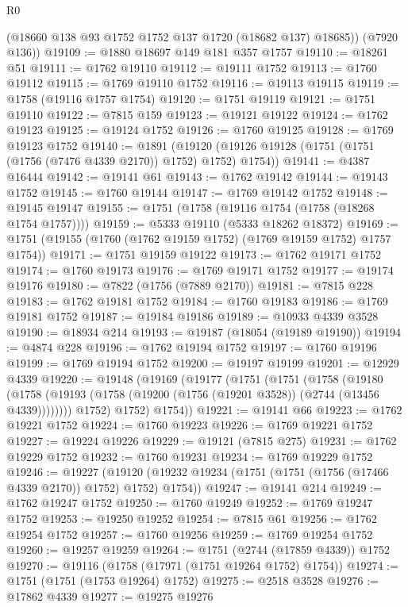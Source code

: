 \begin{lexlean}{R0}
\begin{coremodule}
        (@18660 @138 @93 @1752 @1752 @137 @1720 (@18682 @137) @18685))
      (@7920 @136))
@19109 := @1880 @18697 @149 @181 @357 @1757
@19110 := @18261 @51
@19111 := @1762 @19110
@19112 := @19111 @1752
@19113 := @1760 @19112
@19115 := @1769 @19110 @1752
@19116 := @19113 @19115
@19119 := @1758 (@19116 @1757 @1754)
@19120 := @1751 @19119
@19121 := @1751 @19110
@19122 := @7815 @159
@19123 := @19121 @19122
@19124 := @1762 @19123
@19125 := @19124 @1752
@19126 := @1760 @19125
@19128 := @1769 @19123 @1752
@19140 := @1891
    (@19120 (@19126 @19128 (@1751 (@1751 (@1756 (@7476 @4339 @2170)) @1752) @1752) @1754))
@19141 := @4387 @16444
@19142 := @19141 @61
@19143 := @1762 @19142
@19144 := @19143 @1752
@19145 := @1760 @19144
@19147 := @1769 @19142 @1752
@19148 := @19145 @19147
@19155 := @1751 (@1758 (@19116 @1754 (@1758 (@18268 @1754 @1757))))
@19159 := @5333 @19110 (@5333 @18262 @18372)
@19169 := @1751 (@19155 (@1760 (@1762 @19159 @1752) (@1769 @19159 @1752) @1757 @1754))
@19171 := @1751 @19159 @19122
@19173 := @1762 @19171 @1752
@19174 := @1760 @19173
@19176 := @1769 @19171 @1752
@19177 := @19174 @19176
@19180 := @7822 (@1756 (@7889 @2170))
@19181 := @7815 @228
@19183 := @1762 @19181 @1752
@19184 := @1760 @19183
@19186 := @1769 @19181 @1752
@19187 := @19184 @19186
@19189 := @10933 @4339 @3528
@19190 := @18934 @214
@19193 := @19187 (@18054 (@19189 @19190))
@19194 := @4874 @228
@19196 := @1762 @19194 @1752
@19197 := @1760 @19196
@19199 := @1769 @19194 @1752
@19200 := @19197 @19199
@19201 := @12929 @4339
@19220 := @19148
    (@19169
      (@19177
        (@1751
          (@1751
            (@1758
              (@19180
                (@1758 (@19193 (@1758 (@19200 (@1756 (@19201 @3528)) (@2744 (@13456 @4339))))))))
            @1752)
          @1752)
        @1754))
@19221 := @19141 @66
@19223 := @1762 @19221 @1752
@19224 := @1760 @19223
@19226 := @1769 @19221 @1752
@19227 := @19224 @19226
@19229 := @19121 (@7815 @275)
@19231 := @1762 @19229 @1752
@19232 := @1760 @19231
@19234 := @1769 @19229 @1752
@19246 := @19227
    (@19120 (@19232 @19234 (@1751 (@1751 (@1756 (@17466 @4339 @2170)) @1752) @1752) @1754))
@19247 := @19141 @214
@19249 := @1762 @19247 @1752
@19250 := @1760 @19249
@19252 := @1769 @19247 @1752
@19253 := @19250 @19252
@19254 := @7815 @61
@19256 := @1762 @19254 @1752
@19257 := @1760 @19256
@19259 := @1769 @19254 @1752
@19260 := @19257 @19259
@19264 := @1751 (@2744 (@17859 @4339)) @1752
@19270 := @19116 (@1758 (@17971 (@1751 @19264 @1752) @1754))
@19274 := @1751 (@1751 (@1753 @19264) @1752)
@19275 := @2518 @3528
@19276 := @17862 @4339
@19277 := @19275 @19276

\end{coremodule}
\end{lexlean}
